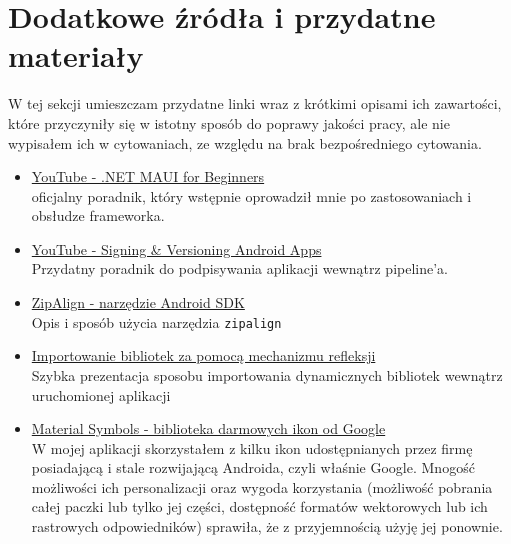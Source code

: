 \section{Dodatkowe źródła i przydatne materiały} \label{dodatkoweZrodla}
W tej sekcji umieszczam przydatne linki wraz z krótkimi opisami ich zawartości,
które przyczyniły się w istotny sposób do poprawy jakości pracy, ale nie wypisałem ich w cytowaniach,
ze względu na brak bezpośredniego cytowania.

\begin{itemize}
    \item \href{https://www.youtube.com/playlist?list=PLdo4fOcmZ0oUBAdL2NwBpDs32zwGqb9DY}%
        {YouTube - .NET MAUI for Beginners} \\
        oficjalny poradnik, który wstępnie oprowadził mnie po zastosowaniach i obsłudze frameworka.
    \item \href{https://www.youtube.com/watch?v=s1grtSSIRVA}%
        {YouTube - Signing \& Versioning Android Apps} \\
        Przydatny poradnik do podpisywania aplikacji wewnątrz pipeline'a.
    \item \href{https://developer.android.com/tools/zipalign}%
        {ZipAlign - narzędzie Android SDK}\\
        Opis i sposób użycia narzędzia \verb|zipalign|
    \item \href{https://learn.microsoft.com/en-us/dotnet/framework/reflection-and-codedom/how-to-load-assemblies-into-the-reflection-only-context}%
        {Importowanie bibliotek za pomocą mechanizmu refleksji}\\
        Szybka prezentacja sposobu importowania dynamicznych bibliotek wewnątrz uruchomionej aplikacji
    \item \href{https://fonts.google.com/icons}%
        {Material Symbols - biblioteka darmowych ikon od Google}\\
        W mojej aplikacji skorzystałem z kilku ikon udostępnianych przez firmę posiadającą i stale 
        rozwijającą Androida, czyli właśnie Google. Mnogość możliwości ich personalizacji 
        oraz wygoda korzystania (możliwość pobrania całej paczki lub tylko jej części, 
        dostępność formatów wektorowych lub ich rastrowych odpowiedników) sprawiła, 
        że z przyjemnością użyję jej ponownie.
\end{itemize}

